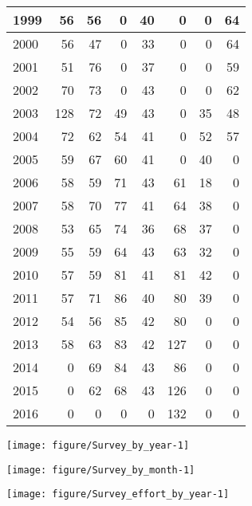 \documentclass[12pt]{article}\usepackage[]{graphicx}\usepackage[]{color}
\makeatletter
\def\maxwidth{ %
  \ifdim\Gin@nat@width>\linewidth
    \linewidth
  \else
    \Gin@nat@width
  \fi
}
\newenvironment{knitrout}{}{} %
\makeatother
\begin{document}
\begin{knitrout}
\begin{tabular}{l|r|r|r|r|r|r|r}
\hline
1999 & 56 & 56 & 0 & 40 & 0 & 0 & 64\\
\hline
2000 & 56 & 47 & 0 & 33 & 0 & 0 & 64\\
\hline
2001 & 51 & 76 & 0 & 37 & 0 & 0 & 59\\
\hline
2002 & 70 & 73 & 0 & 43 & 0 & 0 & 62\\
\hline
2003 & 128 & 72 & 49 & 43 & 0 & 35 & 48\\
\hline
2004 & 72 & 62 & 54 & 41 & 0 & 52 & 57\\
\hline
2005 & 59 & 67 & 60 & 41 & 0 & 40 & 0\\
\hline
2006 & 58 & 59 & 71 & 43 & 61 & 18 & 0\\
\hline
2007 & 58 & 70 & 77 & 41 & 64 & 38 & 0\\
\hline
2008 & 53 & 65 & 74 & 36 & 68 & 37 & 0\\
\hline
2009 & 55 & 59 & 64 & 43 & 63 & 32 & 0\\
\hline
2010 & 57 & 59 & 81 & 41 & 81 & 42 & 0\\
\hline
2011 & 57 & 71 & 86 & 40 & 80 & 39 & 0\\
\hline
2012 & 54 & 56 & 85 & 42 & 80 & 0 & 0\\
\hline
2013 & 58 & 63 & 83 & 42 & 127 & 0 & 0\\
\hline
2014 & 0 & 69 & 84 & 43 & 86 & 0 & 0\\
\hline
2015 & 0 & 62 & 68 & 43 & 126 & 0 & 0\\
\hline
2016 & 0 & 0 & 0 & 0 & 132 & 0 & 0\\
\hline
\end{tabular}



{\centering \texttt{[image: figure/Survey\_by\_year-1]} 

}



\end{knitrout}

\begin{knitrout}\footnotesize
{}\color{fgcolor}

{\centering \texttt{[image: figure/Survey\_by\_month-1]} 

}



\end{knitrout}

\begin{knitrout}\footnotesize
{}\color{fgcolor}

{\centering \texttt{[image: figure/Survey\_effort\_by\_year-1]} 

}



\end{knitrout}
\end{document}
